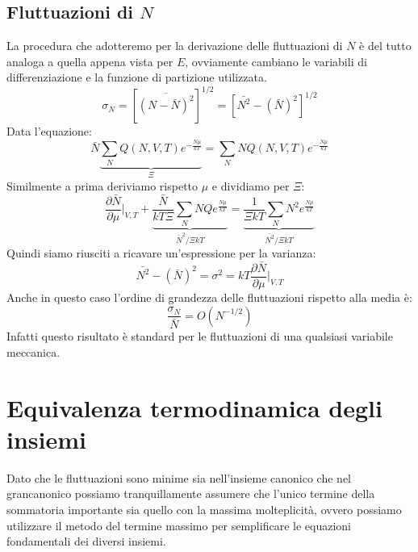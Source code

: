 \documentclass[oneside]{amsbook}
\numberwithin{section}{chapter}
\numberwithin{equation}{section}
\numberwithin{figure}{section}
\begin{document}
\subsection{Fluttuazioni di $N$}
La procedura che adotteremo per la derivazione delle fluttuazioni di $N$ è del tutto analoga a quella appena vista per $E$, ovviamente cambiano le variabili di differenziazione e la funzione di partizione utilizzata.
\begin{equation}
\sigma_N=\left[\overline{\left(N-\bar{N}\right)^2}\right]^{1/2}= \left[ \bar{N^2}-(\bar{N})^2\right]^{1/2}
\end{equation}
Data l'equazione:
\begin{equation}
\bar{N}\underbrace{\sum_NQ(N,V,T) e^{-\frac{N\mu}{kT}}}_{\Xi}=\sum_NNQ(N,V,T) e^{-\frac{N\mu}{kT}}
\end{equation}
Similmente a prima deriviamo rispetto $\mu$ e dividiamo per $\Xi$:
\begin{equation}
\frac{\partial\bar{N}}{\partial\mu}\biggr\rvert_{V,T}+\underbrace{\frac{\bar{N}}{kT\Xi}\sum_NNQe^{\frac{N\mu}{kT}}}_{\bar{N}^2/\Xi kT}=\underbrace{\frac{1}{\Xi kT}\sum_NN^2e^{\frac{N\mu}{kT}}}_{\bar{N^2}/\Xi kT}
\end{equation}
Quindi siamo riusciti a ricavare un'espressione per la varianza:
\begin{equation}
\bar{N^2}-(\bar{N})^2=\sigma^2=kT\frac{\partial\bar{N}}{\partial\mu}\biggr\rvert_{V,T}
\end{equation}
Anche in questo caso l'ordine di grandezza delle fluttuazioni rispetto alla media è:
\begin{equation}
\frac{\sigma_N}{\bar{N}}=O(N^{-1/2})
\end{equation}
Infatti questo risultato è standard per le fluttuazioni di una qualsiasi variabile meccanica.
\section{Equivalenza termodinamica degli insiemi}
Dato che le fluttuazioni sono minime sia nell'insieme canonico che nel grancanonico possiamo tranquillamente assumere che l'unico termine della sommatoria importante sia quello con la massima molteplicità, ovvero possiamo utilizzare il metodo del termine massimo per semplificare le equazioni fondamentali dei diversi insiemi.
\end{document}
